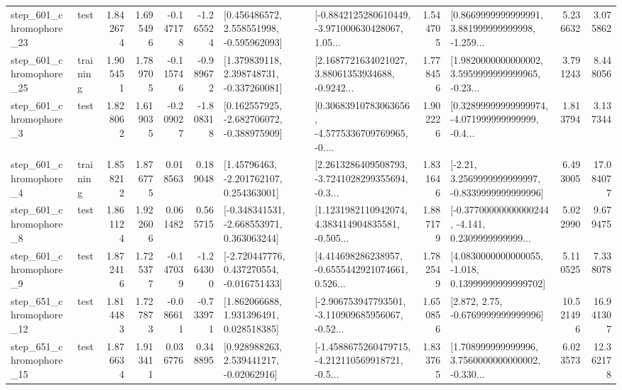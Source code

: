 \begin{tabular}{llrrrrllrlrr}
  step\_601\_chromophore\_23 &      test &      1.842674 &    1.695496 &     -0.147178 & -1.265524 &    [0.456486572, 2.558551998, -0.595962093] &  [-0.8842125280610449, -3.971000630428067, 1.05... &       1.544705 &  [0.8669999999999991, 3.881999999999998, -1.259... &            5.236632 &          3.075862 \\
  step\_601\_chromophore\_25 &  training &      1.905451 &    1.789705 &     -0.115746 & -0.989672 &    [1.379839118, 2.398748731, -0.337260081] &  [2.1687721634021027, 3.88061353934688, -0.9242... &       1.778456 &  [1.9820000000000002, 3.5959999999999965, -0.23... &            3.791243 &          8.448056 \\
   step\_601\_chromophore\_3 &      test &      1.828062 &    1.619035 &     -0.209027 & -1.808318 &   [0.162557925, -2.682706072, -0.388975909] &  [0.30683910783063656, -4.5775336709769965, -0.... &       1.902226 &  [0.32899999999999974, -4.071999999999999, -0.4... &            1.813794 &          3.137344 \\
   step\_601\_chromophore\_4 &  training &      1.858212 &    1.876775 &      0.018563 &  0.189048 &     [1.45796463, -2.201762107, 0.254363001] &  [2.2613286409508793, -3.7241028299355694, -0.3... &       1.831646 &   [-2.21, 3.2569999999999997, -0.8339999999999996] &            6.493005 &         17.084077 \\
   step\_601\_chromophore\_8 &      test &      1.861124 &    1.922606 &      0.061482 &  0.565715 &   [-0.348341531, -2.668553971, 0.363063244] &  [1.1231982110942074, 4.383414904835581, -0.505... &       1.887179 &  [-0.37700000000000244, -4.141, 0.2309999999999... &            5.022990 &          9.679475 \\
   step\_601\_chromophore\_9 &      test &      1.872416 &    1.725377 &     -0.147039 & -1.264300 &   [-2.720447776, 0.437270554, -0.016751433] &  [4.414698286238957, -0.6555442921074661, 0.526... &       1.782549 &  [4.0830000000000055, -1.018, 0.13999999999999702] &            5.110525 &          7.338078 \\
  step\_651\_chromophore\_12 &      test &      1.814483 &    1.727873 &     -0.086611 & -0.733971 &     [1.862066688, 1.931396491, 0.028518385] &  [-2.906753947793501, -3.110909685956067, -0.52... &       1.650856 &                 [2.872, 2.75, -0.6769999999999996] &           10.521496 &         16.941307 \\
  step\_651\_chromophore\_15 &      test &      1.876634 &    1.913411 &      0.036776 &  0.348895 &     [0.928988263, 2.539441217, -0.02062916] &  [-1.4588675260479715, -4.212110569918721, -0.5... &       1.833765 &  [1.708999999999996, 3.7560000000000002, -0.330... &            6.023573 &         12.362178 \\

\end{tabular}
